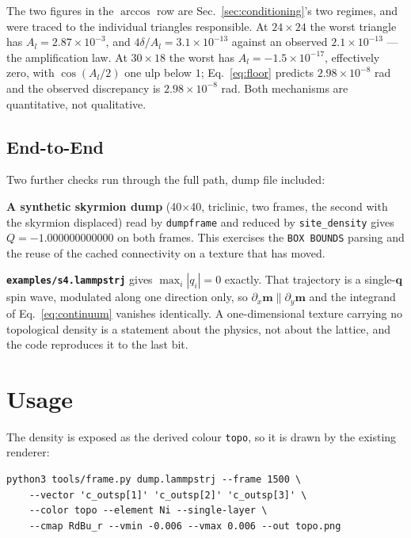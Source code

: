 \documentclass[12pt, a4paper, oneside]{article}
\newcommand{\mvec}{\mathbf{m}}
\begin{document}
The two figures in the $\arccos$ row are Sec.~\ref{sec:conditioning}'s two
regimes, and were traced to the individual triangles responsible. At
$24\times24$ the worst triangle has $A_l = 2.87\times10^{-3}$, and
$4\delta/A_l = 3.1\times10^{-13}$ against an observed $2.1\times10^{-13}$ --- the
amplification law. At $30\times18$ the worst has $A_l = -1.5\times10^{-17}$,
effectively zero, with $\cos(A_l/2)$ one ulp below $1$; Eq.~\eqref{eq:floor}
predicts $2.98\times10^{-8}$ rad and the observed discrepancy is
$2.98\times10^{-8}$ rad. Both mechanisms are quantitative, not qualitative.

\subsection{End-to-End}

Two further checks run through the full path, dump file included:

\textbf{A synthetic skyrmion dump} (40$\times$40, triclinic, two frames, the
second with the skyrmion displaced) read by \texttt{dumpframe} and reduced by
\texttt{site\_density} gives $Q = -1.000000000000$ on both frames. This
exercises the \texttt{BOX BOUNDS} parsing and the reuse of the cached
connectivity on a texture that has moved.

\textbf{\texttt{examples/s4.lammpstrj}} gives $\max_i|q_i| = 0$ exactly. That
trajectory is a single-$\mathbf{q}$ spin wave, modulated along one direction
only, so $\partial_x\mvec \parallel \partial_y\mvec$ and the integrand of
Eq.~\eqref{eq:continuum} vanishes identically. A one-dimensional texture
carrying no topological density is a statement about the physics, not about the
lattice, and the code reproduces it to the last bit.

\section{Usage}

The density is exposed as the derived colour \texttt{topo}, so it is drawn by
the existing renderer:

\begin{verbatim}
python3 tools/frame.py dump.lammpstrj --frame 1500 \
    --vector 'c_outsp[1]' 'c_outsp[2]' 'c_outsp[3]' \
    --color topo --element Ni --single-layer \
    --cmap RdBu_r --vmin -0.006 --vmax 0.006 --out topo.png
\end{verbatim}
\end{document}
